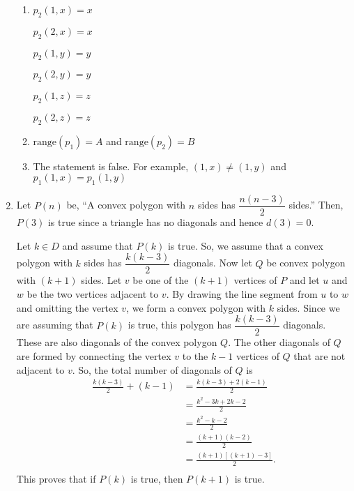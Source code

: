 \begin{enumerate}
\begin{enumerate}
\item
\begin{multicols}{3}
$p_2 ( 1, x ) = x$

$p_2 ( 2, x ) = x$

$p_2 ( 1, y ) = y$

$p_2 ( 2, y ) = y$

$p_2 ( 1, z ) = z$

$p_2 ( 2, z ) = z$
\end{multicols}
\item $\text{range} ( p_1 ) = A$ and $\text{range} ( p_2 ) = B$

\item The statement is false.  For example, $ ( 1, x ) \ne ( 1, y )$ and \\
$p_1 ( 1, x ) = p_1 ( 1, y )$
\end{enumerate}


\item Let $P ( n )$ be, ``A convex polygon with $n$ sides has $\dfrac{n ( n-3 )}{2}$ sides.''  Then, $P ( 3 )$ is true since a triangle has no diagonals and hence $d ( 3 ) = 0$.
  
Let  $k \in D$  and assume that $P ( k )$ is true.  So, we assume that a convex polygon with  $k$  sides has  $\dfrac{{k( {k - 3} )}}{2}$  diagonals.   Now let  $Q$  be convex polygon with  $( {k + 1} )$ sides.  Let  $v$  be one of the 
$( {k + 1} )$ vertices of $P$  and let  $u$  and  $w$  be the two vertices adjacent to  $v$.  By drawing the line segment from  $u$  to  $w$ and omitting the vertex  $v$, we form a convex polygon with  $k$  sides.  Since we are assuming that $P ( k )$ is true, this polygon has $\dfrac{{k( {k - 3} )}}{2}$  diagonals.  These are also diagonals of the convex polygon $Q$.  The other diagonals of $Q$ are formed by connecting the vertex  $v$ to the 
$k - 1$ vertices of $Q$ that are not adjacent to $v$.  So, the total number of diagonals of $Q$ is
\[
\begin{aligned}
\frac{{k( {k - 3} )}}{2} + ( k - 1 ) &= 
\frac{k ( k - 3 ) + 2 ( k - 1 )}{2} \\
  &= \frac{k^2 - 3k + 2k - 2}{2} \\
  &= \frac{k^2 - k - 2}{2} \\
  &= \frac{( k + 1 ) ( k - 2 )}{2} \\
  &= \frac{( k + 1 ) \left[ ( k + 1 ) - 3 \right]}{2}. \\
\end{aligned}
\]
This proves that if $P ( k )$ is true, then $P ( k + 1 )$ is true.




\end{enumerate}

